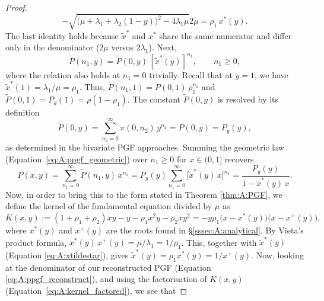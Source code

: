 \begin{proof}
\begin{equation}
{                - \sqrt{\bigl(\mu + \lambda_1 + \lambda_2(1-y)\bigr)^2 - 4\lambda_1\mu}}{2\mu}
        = \rho_1\,x^*(y).
        \label{eq:A:xtildestar}
    \end{equation}
    The last identity holds because $\widetilde{x}^*$ and $x^*$ share the same numerator and differ only in the denominator ($2\mu$ versus $2\lambda_1$). Next,
    \begin{equation}
        \widetilde{P}(n_1, y) = \widetilde{P}(0,y)\,[\widetilde{x}^*(y)]^{n_1},
        \qquad n_1\geq0,
        \label{eq:A:ppgf_geometric}
    \end{equation}
    where the relation also holds at $n_1=0$ trivially.
    Recall that at $y=1$, we have $\widetilde{x}^*(1)=\lambda_1/\mu=\rho_1$. Thus, $\widetilde{P}(n_1,1)=\widetilde{P}(0,1)\,\rho_1^{n_1}$ and $\widetilde{P}(0,1)=P_y(1)=\rho(1-\rho_1)$. The constant $\widetilde{P}(0,y)$ is resolved by its definition
    \begin{equation*}
        \widetilde{P}(0,y) = \sum_{n_2=0}^{\infty}\pi(0,n_2)\,y^{n_2} = P(0,y) = P_y(y),
    \end{equation*}
    as determined in the bivariate PGF approaches.
    Summing the geometric law (Equation~\eqref{eq:A:ppgf_geometric}) over $n_1 \geq 0$ for $x \in (0,1]$ recovers
    \begin{equation}
        P(x,y) = \sum_{n_1=0}^{\infty}\widetilde{P}(n_1,y)\,x^{n_1}
               = P_y(y)\sum_{n_1=0}^{\infty}\bigl[\widetilde{x}^*(y)\,x\bigr]^{n_1}
               = \frac{P_y(y)}{1-\widetilde{x}^*(y)\,x}.
        \label{eq:A:ppgf_reconstruct}
    \end{equation}
    Now, in order to bring this to the form stated in Theorem \ref{thm:A:PGF}, we define the kernel of the fundamental equation divided by $\mu$ as
    \begin{equation}
        K(x,y) := (1+\rho_1+\rho_2)xy - y - \rho_1 x^2 y - \rho_2 x y^2
                = -y\rho_1\bigl(x-x^*(y)\bigr)\bigl(x-x^{+}(y)\bigr),
        \label{eq:A:kernel_factored}
    \end{equation}
    where $x^*(y)$ and $x^{+}(y)$ are the roots found in \S\ref{sssec:A:analytical}. By Vieta's product formula, $x^*(y)\,x^{+}(y)=\mu/\lambda_1=1/\rho_1$. This, together with $\widetilde{x}^*(y)$ (Equation \eqref{eq:A:xtildestar}), gives $\widetilde{x}^*(y)=\rho_1 x^*(y)=1/x^{+}(y)$.
    Now, looking at the denominator of our reconstructed PGF (Equation \eqref{eq:A:ppgf_reconstruct}), and using the factorisation of $K(x,y)$ (Equation~\eqref{eq:A:kernel_factored}), we see that

\end{proof}
